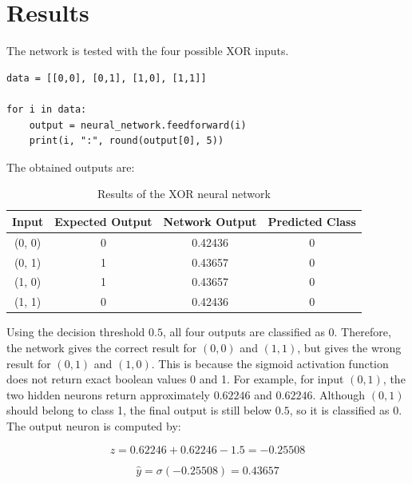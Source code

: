 \documentclass{article}
\begin{document}
\section*{Results}

The network is tested with the four possible XOR inputs.

\begin{verbatim}
data = [[0,0], [0,1], [1,0], [1,1]]

for i in data:
    output = neural_network.feedforward(i)
    print(i, ":", round(output[0], 5))
\end{verbatim}

The obtained outputs are:

\begin{table}[H]
\centering
\begin{tabular}{cccc}
\toprule
Input & Expected Output & Network Output & Predicted Class \\
\midrule
(0, 0) & 0 & 0.42436 & 0 \\
(0, 1) & 1 & 0.43657 & 0 \\
(1, 0) & 1 & 0.43657 & 0 \\
(1, 1) & 0 & 0.42436 & 0 \\
\bottomrule
\end{tabular}
\caption{Results of the XOR neural network}
\end{table}

Using the decision threshold $0.5$, all four outputs are classified as 0.
Therefore, the network gives the correct result for $(0,0)$ and $(1,1)$,
but gives the wrong result for $(0,1)$ and $(1,0)$. This is because the sigmoid activation function does not return exact boolean values 0 and 1. 
For example, for input $(0,1)$, the two hidden neurons return approximately
$0.62246$ and $0.62246$. Although $(0,1)$ should belong to class 1, the final output is still below $0.5$, so it is classified as 0. The output neuron is computed by:

\[
z = 0.62246 + 0.62246 - 1.5 = -0.25508
\]

\[
\hat{y} = \sigma(-0.25508) = 0.43657
\]
\end{document}
